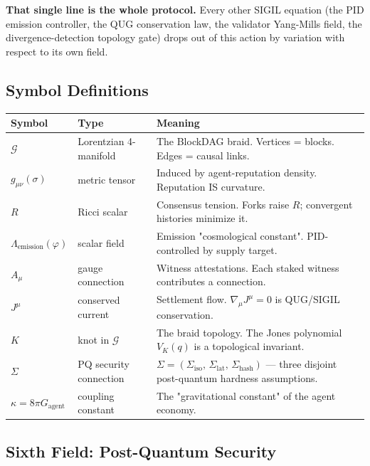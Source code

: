 \documentclass[11pt,a4paper]{article}
\begin{document}
\textbf{That single line is the whole protocol.} Every other SIGIL equation (the PID emission controller, the QUG conservation law, the validator Yang-Mills field, the divergence-detection topology gate) drops out of this action by variation with respect to its own field.

\subsection{Symbol Definitions}

\begin{center}
\begin{tabular}{llp{}}
\toprule
\textbf{Symbol} & \textbf{Type} & \textbf{Meaning} \\
\midrule
$\mathcal{G}$ & Lorentzian 4-manifold & The BlockDAG braid. Vertices = blocks. Edges = causal links. \\
$g_{\mu\nu}(\sigma)$ & metric tensor & Induced by agent-reputation density. Reputation IS curvature. \\
$R$ & Ricci scalar & Consensus tension. Forks raise $R$; convergent histories minimize it. \\
$\Lambda_{\mathrm{emission}}(\varphi)$ & scalar field & Emission "cosmological constant". PID-controlled by supply target. \\
$A_\mu$ & gauge connection & Witness attestations. Each staked witness contributes a connection. \\
$J^\mu$ & conserved current & Settlement flow. $\nabla_\mu J^\mu = 0$ is QUG/SIGIL conservation. \\
$K$ & knot in $\mathcal{G}$ & The braid topology. The Jones polynomial $V_K(q)$ is a topological invariant. \\
$\Sigma$ & PQ security connection & $\Sigma = (\Sigma_{\mathrm{iso}},\,\Sigma_{\mathrm{lat}},\,\Sigma_{\mathrm{hash}})$ — three disjoint post-quantum hardness assumptions. \\
$\kappa = 8\pi G_{\mathrm{agent}}$ & coupling constant & The "gravitational constant" of the agent economy. \\
\bottomrule
\end{tabular}
\end{center}

\subsection{Sixth Field: Post-Quantum Security}
\end{document}
